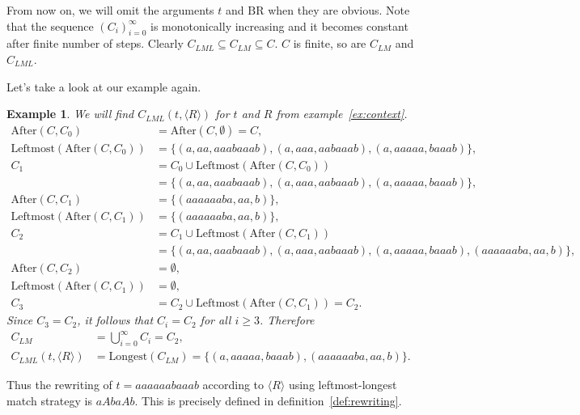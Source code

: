 \documentclass{article}
\newtheorem{example}[definition]{Example}
\begin{document}
	From now on, we will omit the arguments $t$ and $\mathrm{BR}$ when they are obvious.
	Note that the sequence $(C_i)_{i=0}^\infty$ is monotonically increasing and it becomes constant after finite number of steps.
	Clearly $C_{LML} \subseteq C_{LM} \subseteq C$. $C$ is finite, so are $C_{LM}$ and $C_{LML}$.
	
	Let's take a look at our example again.
	\begin{example} \label{ex:C_{LML}}
		We will find $C_{LML}(t, \langle R \rangle)$ for $t$ and $R$ from example~\ref{ex:context}.
		\begingroup
			\allowdisplaybreaks
			\begin{align*}
				\mathrm{After}(C, C_0) &= \mathrm{After}(C, \emptyset) = C, \\
				\mathrm{Leftmost}(\mathrm{After}(C, C_0)) &= \{ (a, aa, aaabaaab), (a, aaa, aabaaab), (a, aaaaa, baaab) \}, \\
				C_1 &= C_0 \cup \mathrm{Leftmost}(\mathrm{After}(C, C_0)) \\
					&= \{ (a, aa, aaabaaab), (a, aaa, aabaaab), (a, aaaaa, baaab) \}, \\
				\mathrm{After}(C, C_1) &= \{ (aaaaaaba, aa, b) \}, \\
				\mathrm{Leftmost}(\mathrm{After}(C, C_1)) &= \{ (aaaaaaba, aa, b) \}, \\
				C_2 &= C_1 \cup \mathrm{Leftmost}(\mathrm{After}(C, C_1)) \\
					&= \{ (a, aa, aaabaaab), (a, aaa, aabaaab), (a, aaaaa, baaab), (aaaaaaba, aa, b) \}, \\
				\mathrm{After}(C, C_2) &= \emptyset, \\
				\mathrm{Leftmost}(\mathrm{After}(C, C_1)) &= \emptyset, \\
				C_3 &= C_2 \cup \mathrm{Leftmost}(\mathrm{After}(C, C_1)) = C_2.
			\end{align*}
		\endgroup
		Since $C_3 = C_2$, it follows that $C_i = C_2$ for all $i\ge 3$. Therefore
		\begin{align*}
			C_{LM} &= \bigcup_{i=0}^\infty C_i = C_2, \\
			C_{LML}(t, \langle R \rangle) &= \mathrm{Longest}(C_{LM}) = \{ (a, aaaaa, baaab), (aaaaaaba, aa, b) \}.
		\end{align*}
	\end{example}
	
	Thus the rewriting of $t=aaaaaabaaab$ according to $\langle R \rangle$ using leftmost-longest match strategy is $aAbaAb$.
	This is precisely defined in definition~\ref{def:rewriting}.
	
\end{document}
